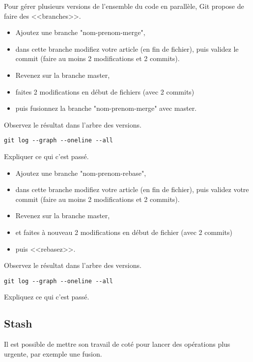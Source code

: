 \documentclass[a4paper]{article}
\begin{document}
Pour gérer plusieurs versions de l'ensemble du code en parallèle, Git propose de faire des <<branches>>.

\begin{itemize}
  \item Ajoutez une branche "nom-prenom-merge", 
  \item dans cette branche modifiez votre article (en fin de fichier), puis validez le commit (faire au moins 2 modifications et 2 commits). 
  \item Revenez sur la branche master, 
  \item faites 2 modifications en début de fichiers (avec 2 commits) 
  \item puis fusionnez la branche "nom-prenom-merge" avec master.
\end{itemize}

Observez le résultat dans l'arbre des versions. 
\begin{verbatim}
git log --graph --oneline --all
\end{verbatim}

Expliquer ce qui c'est passé.

\begin{itemize}
  \item Ajoutez une branche "nom-prenom-rebase", 
  \item dans cette branche modifiez votre article (en fin de fichier), puis validez votre commit (faire au moins 2 modifications et 2 commits). 
  \item Revenez sur la branche master, 
  \item et faites à nouveau 2 modifications en début de fichier (avec 2 commits) 
  \item puis <<rebasez>>.
\end{itemize}

Observez le résultat dans l'arbre des versions. 
\begin{verbatim}
git log --graph --oneline --all
\end{verbatim}

Expliquez ce qui c'est passé.

\subsection{Stash}

Il est possible de mettre son travail de coté pour lancer des opérations plus urgente, par exemple une fusion.
\end{document}
